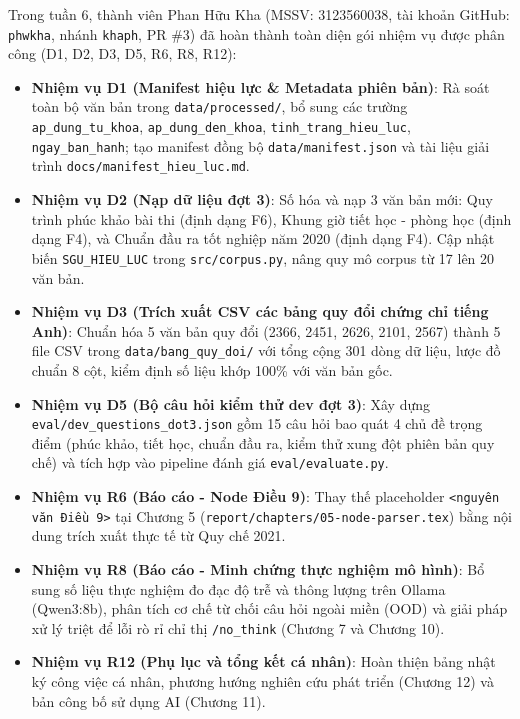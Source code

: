 Trong tuần 6, thành viên Phan Hữu Kha (MSSV: 3123560038, tài khoản GitHub: \texttt{phwkha}, nhánh \texttt{khaph}, PR \#3) đã hoàn thành toàn diện gói nhiệm vụ được phân công (D1, D2, D3, D5, R6, R8, R12):

\begin{itemize}
  \item \textbf{Nhiệm vụ D1 (Manifest hiệu lực \& Metadata phiên bản)}: Rà soát toàn bộ văn bản trong \texttt{data/processed/}, bổ sung các trường \texttt{ap\_dung\_tu\_khoa}, \texttt{ap\_dung\_den\_khoa}, \texttt{tinh\_trang\_hieu\_luc}, \texttt{ngay\_ban\_hanh}; tạo manifest đồng bộ \texttt{data/manifest.json} và tài liệu giải trình \texttt{docs/manifest\_hieu\_luc.md}.
  \item \textbf{Nhiệm vụ D2 (Nạp dữ liệu đợt 3)}: Số hóa và nạp 3 văn bản mới: Quy trình phúc khảo bài thi (định dạng F6), Khung giờ tiết học - phòng học (định dạng F4), và Chuẩn đầu ra tốt nghiệp năm 2020 (định dạng F4). Cập nhật biến \texttt{SGU\_HIEU\_LUC} trong \texttt{src/corpus.py}, nâng quy mô corpus từ 17 lên 20 văn bản.
  \item \textbf{Nhiệm vụ D3 (Trích xuất CSV các bảng quy đổi chứng chỉ tiếng Anh)}: Chuẩn hóa 5 văn bản quy đổi (2366, 2451, 2626, 2101, 2567) thành 5 file CSV trong \texttt{data/bang\_quy\_doi/} với tổng cộng 301 dòng dữ liệu, lược đồ chuẩn 8 cột, kiểm định số liệu khớp 100\% với văn bản gốc.
  \item \textbf{Nhiệm vụ D5 (Bộ câu hỏi kiểm thử dev đợt 3)}: Xây dựng \texttt{eval/dev_questions_dot3.json} gồm 15 câu hỏi bao quát 4 chủ đề trọng điểm (phúc khảo, tiết học, chuẩn đầu ra, kiểm thử xung đột phiên bản quy chế) và tích hợp vào pipeline đánh giá \texttt{eval/evaluate.py}.
  \item \textbf{Nhiệm vụ R6 (Báo cáo - Node Điều 9)}: Thay thế placeholder \texttt{<nguyên văn Điều 9>} tại Chương 5 (\texttt{report/chapters/05-node-parser.tex}) bằng nội dung trích xuất thực tế từ Quy chế 2021.
  \item \textbf{Nhiệm vụ R8 (Báo cáo - Minh chứng thực nghiệm mô hình)}: Bổ sung số liệu thực nghiệm đo đạc độ trễ và thông lượng trên Ollama (Qwen3:8b), phân tích cơ chế từ chối câu hỏi ngoài miền (OOD) và giải pháp xử lý triệt để lỗi rò rỉ chỉ thị \texttt{/no\_think} (Chương 7 và Chương 10).
  \item \textbf{Nhiệm vụ R12 (Phụ lục và tổng kết cá nhân)}: Hoàn thiện bảng nhật ký công việc cá nhân, phương hướng nghiên cứu phát triển (Chương 12) và bản công bố sử dụng AI (Chương 11).
\end{itemize}

